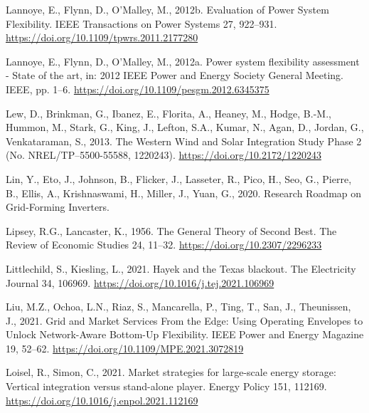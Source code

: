 \documentclass[12pt,a4paper,]{report}
\newlength{\cslhangindent}
\newenvironment{CSLReferences}[2] %
 {%
  \setlength{\parindent}{0pt}
  \ifodd #1 \everypar{\setlength{\hangindent}{\cslhangindent}}\ignorespaces\fi
  \ifnum #2 > 0
  \setlength{\parskip}{#2\baselineskip}
  \fi
 }%
 {}
\begin{document}
\begin{CSLReferences}{1}{0}
\leavevmode{}%
Lannoye, E., Flynn, D., O'Malley, M., 2012b. Evaluation of {Power System
Flexibility}. IEEE Transactions on Power Systems 27, 922--931.
\url{https://doi.org/10.1109/tpwrs.2011.2177280}

\leavevmode{}%
Lannoye, E., Flynn, D., O'Malley, M., 2012a. Power system flexibility
assessment - {State} of the art, in: 2012 {IEEE Power} and {Energy
Society General Meeting}. {IEEE}, pp. 1--6.
\url{https://doi.org/10.1109/pesgm.2012.6345375}

\leavevmode{}%
Lew, D., Brinkman, G., Ibanez, E., Florita, A., Heaney, M., Hodge,
B.-M., Hummon, M., Stark, G., King, J., Lefton, S.A., Kumar, N., Agan,
D., Jordan, G., Venkataraman, S., 2013. The {Western Wind} and {Solar
Integration Study Phase} 2 (No. NREL/TP--5500-55588, 1220243).
\url{https://doi.org/10.2172/1220243}

\leavevmode{}%
Lin, Y., Eto, J., Johnson, B., Flicker, J., Lasseter, R., Pico, H., Seo,
G., Pierre, B., Ellis, A., Krishnaswami, H., Miller, J., Yuan, G., 2020.
Research {Roadmap} on {Grid-Forming Inverters}.

\leavevmode{}%
Lipsey, R.G., Lancaster, K., 1956. The {General Theory} of {Second
Best}. The Review of Economic Studies 24, 11--32.
\url{https://doi.org/10.2307/2296233}

\leavevmode{}%
Littlechild, S., Kiesling, L., 2021. Hayek and the {Texas} blackout. The
Electricity Journal 34, 106969.
\url{https://doi.org/10.1016/j.tej.2021.106969}

\leavevmode{}%
Liu, M.Z., Ochoa, L.N., Riaz, S., Mancarella, P., Ting, T., San, J.,
Theunissen, J., 2021. Grid and {Market Services From} the {Edge}: {Using
Operating Envelopes} to {Unlock Network-Aware Bottom-Up Flexibility}.
IEEE Power and Energy Magazine 19, 52--62.
\url{https://doi.org/10.1109/MPE.2021.3072819}

\leavevmode{}%
Loisel, R., Simon, C., 2021. Market strategies for large-scale energy
storage: {Vertical} integration versus stand-alone player. Energy Policy
151, 112169. \url{https://doi.org/10.1016/j.enpol.2021.112169}


\end{CSLReferences}
\end{document}
